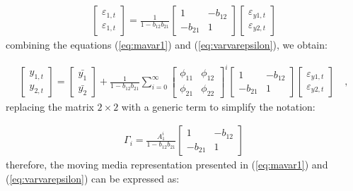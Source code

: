 \begin{align} \label{eq:varvarepsilon}
    \begin{bmatrix}
    \varepsilon_{1,t} \\
    \varepsilon_{1,t}
    \end{bmatrix} = \frac{1}{1 - b_{12}b_{21}}
    \begin{bmatrix}
    1 & -b_{12} \\
    -b_{21} & 1
    \end{bmatrix}
    \begin{bmatrix}
    \varepsilon_{y1, t} \\
    \varepsilon_{y2, t}
    \end{bmatrix}
\end{align}
combining the equations (\ref{eq:mavar1}) and (\ref{eq:varvarepsilon}), we obtain:

\begin{align*}
    \begin{bmatrix}
    y_{1,t} \\
    y_{2,t}
    \end{bmatrix} =
    \begin{bmatrix}
    \bar{y_1}\\
    \bar{y_2}
    \end{bmatrix} + \frac{1}{1 - b_{12}b_{21}} \sum_{i=0}^{\infty}
    \begin{bmatrix}
    \phi_{11} & \phi_{12} \\
    \phi_{21} & \phi_{22}
    \end{bmatrix}^i
    \begin{bmatrix}
    1 & -b_{12} \\
    -b_{21} & 1
    \end{bmatrix}
    \begin{bmatrix}
    \varepsilon_{y1, t} \\
    \varepsilon_{y2, t}
    \end{bmatrix} \quad ,
\end{align*}
replacing the matrix $2 \times 2$ with a generic term to simplify the notation:

\begin{align}
    \Gamma_i = \frac{A_1 ^i}{1 - b_{12}b_{21}}\begin{bmatrix}
    1 & -b_{12}\\
    -b_{21} & 1
    \end{bmatrix}
\end{align}
therefore, the moving media representation presented in (\ref{eq:mavar1}) and (\ref{eq:varvarepsilon}) can be expressed as:

